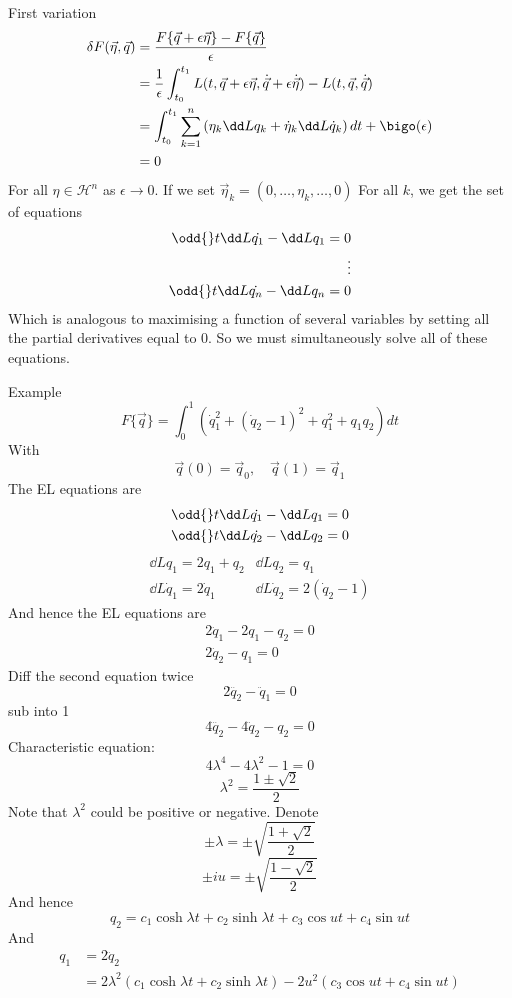\documentclass{E:/Documents/Latex/myassignment}
\begin{document}
First variation
\begin{align*}
	\delta F(\vec \eta,\vec q) &= \frac{F\{\vec q + \epsilon \vec \eta\} - F\{\vec q\}}{\epsilon}\\
	&= \frac1 \epsilon \int_{t_0}^{t_1} L(t,\vec q + \epsilon \vec \eta, \dot{\vec q} + \epsilon \dot{\vec \eta}) - L(t,\vec q, \dot{\vec q})\\
	&= \int_{t_0}^{t_1} \sum_{k=1}^n \left(\eta_k \dd L{q_k} + \dot{\eta}_k \dd L{\dot q_k}\right) dt + \bigo(\epsilon)\\
	&= 0 
\end{align*}
For all $\eta \in \mathcal{H}^n$ as $\epsilon \to 0$.
If we set $\vec \eta_k = (0,\ldots,\eta_k,\ldots,0)$
For all $k$, we get the set of equations
\begin{align*}
	\odd{}t \dd L{\dot{q_1}} - \dd L{q_1} = 0\\
	\vdots\\
	\odd{}t \dd L{\dot{q_n}} - \dd L{q_n} = 0\\
\end{align*}
Which is analogous to maximising a function of several variables by setting all the partial derivatives equal to $0$. So we must simultaneously solve all of these equations.

Example 
\[F\{\vec q\} = \int_0^1 \left(\dot q_1^2 + (\dot q_2 -1 )^2 + q_1^2 + q_1q_2\right) dt\]
With
\[\vec q(0) = \vec q_0, \quad \vec q(1) = \vec q_1\]
The EL equations are
\begin{align*}
	\odd{}t \dd L{\dot{q_1}} - \dd L{q_1} = 0\\
	\odd{}t \dd L{\dot{q_2}} - \dd L{q_2} = 0\\
\end{align*}
\[\begin{matrix}
	\dd L{q_1} = 2q_1 + q_2 & \dd L{q_2} = q_1\\
	\dd L{\dot q_1} = 2\dot q_1 & \dd L{\dot q_2} = 2(\dot q_2 - 1)
\end{matrix}\]
And hence the EL equations are
\begin{align*}
	2\ddot{q}_1 - 2q_1 - q_2 = 0\\
	2 \ddot{q}_2 - q_1 = 0
\end{align*}
Diff the second equation twice
\[2\ddddot{q}_2 - \ddot{q}_1 = 0\]
sub into 1
\[4 \ddddot{q}_2 - 4\ddot q_2 - q_2 = 0\]
Characteristic equation:
\[4 \lambda^4 - 4\lambda^2 - 1 = 0\]
\[\lambda^2 = \frac{1 \pm \sqrt{2}}{2}\]
Note that $\lambda^2$ could be positive or negative. Denote
\[\pm \lambda =\pm \sqrt{\frac{1 + \sqrt{2}}{2}}\]
\[\pm iu = \pm \sqrt{\frac{1 - \sqrt{2}}{2}}\]
And hence
\[q_2 = c_1 \cosh \lambda t + c_2 \sinh \lambda t + c_3 \cos ut + c_4 \sin ut\]
And
\begin{align*}
	q_1 &= 2 \ddot{q}_2 \\
	&= 2 \lambda^2 (c_1 \cosh \lambda t + c_2 \sinh \lambda t) - 2u^2 \left(c_3 \cos ut + c_4 \sin ut\right)
\end{align*}
\end{document}
